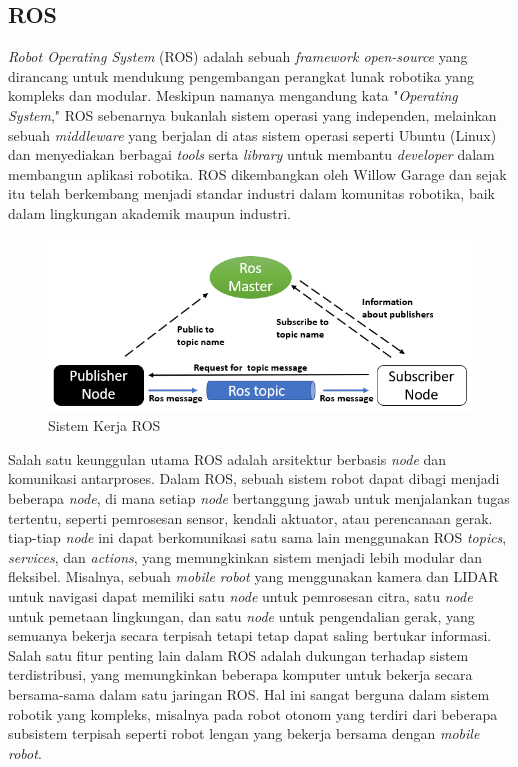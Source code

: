 \subsection{ROS}
\emph{Robot Operating System} (ROS) adalah sebuah \emph{framework open-source} yang dirancang untuk mendukung pengembangan
perangkat lunak robotika yang kompleks dan modular. Meskipun namanya mengandung kata "\emph{Operating System}," ROS
sebenarnya bukanlah sistem operasi yang independen, melainkan sebuah \emph{middleware} yang berjalan di atas sistem operasi
seperti Ubuntu (Linux) dan menyediakan berbagai \emph{tools} serta \emph{library} untuk membantu \emph{developer} dalam membangun
aplikasi robotika. ROS dikembangkan oleh Willow Garage dan sejak itu telah berkembang menjadi standar industri
dalam komunitas robotika, baik dalam lingkungan akademik maupun industri.

\begin{figure} [H] \centering
    \includegraphics[scale=0.65]{gambar/ros_system.png}
    \caption{Sistem Kerja ROS\parencite{img_ros_system}}
    \label{fig:ros_system}
\end{figure}

Salah satu keunggulan utama ROS adalah arsitektur berbasis \emph{node} dan komunikasi antarproses\parencite{ros_website}. Dalam ROS,
sebuah sistem robot dapat dibagi menjadi beberapa \emph{node}, di mana setiap \emph{node} bertanggung jawab untuk menjalankan tugas
tertentu, seperti pemrosesan sensor, kendali aktuator, atau perencanaan gerak. tiap-tiap \emph{node} ini dapat berkomunikasi
satu sama lain menggunakan ROS \emph{topics}, \emph{services}, dan \emph{actions}, yang memungkinkan sistem menjadi lebih modular dan
fleksibel. Misalnya, sebuah \emph{mobile robot} yang menggunakan kamera dan LIDAR untuk navigasi dapat memiliki satu \emph{node}
untuk pemrosesan citra, satu \emph{node} untuk pemetaan lingkungan, dan satu \emph{node} untuk pengendalian gerak, yang semuanya
bekerja secara terpisah tetapi tetap dapat saling bertukar informasi.
Salah satu fitur penting lain dalam ROS adalah dukungan terhadap sistem terdistribusi, yang memungkinkan
beberapa komputer untuk bekerja secara bersama-sama dalam satu jaringan ROS. Hal ini sangat berguna dalam
sistem robotik yang kompleks, misalnya pada robot otonom yang terdiri dari beberapa subsistem terpisah
seperti robot lengan yang bekerja bersama dengan \emph{mobile robot}.

